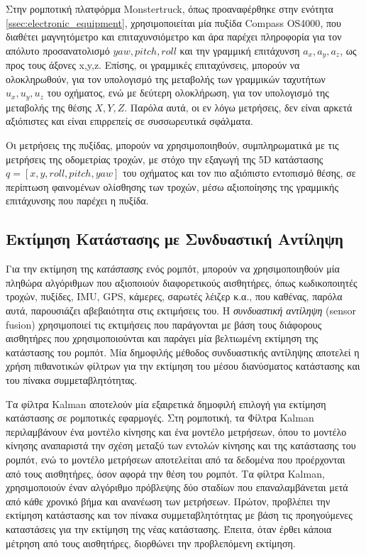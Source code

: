 \bigskip
Στην ρομποτική πλατφόρμα {Monstertruck}, όπως προαναφέρθηκε στην ενότητα \ref{ssec:electronic_equipment}, χρησιμοποιείται μία πυξίδα {Compass OS4000}, που διαθέτει μαγνητόμετρο και επιταχυνσιόμετρο και άρα παρέχει πληροφορία για τον απόλυτο προσανατολισμό $yaw, pitch, roll$ και την γραμμική επιτάχυνση $a_x, a_y, a_z$, ως προς τους άξονες x,y,z. Επίσης, οι γραμμικές επιταχύνσεις, μπορούν να ολοκληρωθούν, για τον υπολογισμό της μεταβολής των γραμμικών ταχυτήτων $u_x, u_y, u_z$ του οχήματος, ενώ με δεύτερη ολοκλήρωση, για τον υπολογισμό της μεταβολής της θέσης $X, Y, Z$. Παρόλα αυτά, οι εν λόγω μετρήσεις, δεν είναι αρκετά αξιόπιστες και είναι επιρρεπείς σε συσσωρευτικά σφάλματα.

\bigskip
Οι μετρήσεις της πυξίδας, μπορούν να χρησιμοποιηθούν, συμπληρωματικά με τις μετρήσεις της {οδομετρίας τροχών}, με στόχο την εξαγωγή της 5D κατάστασης $q = [x, y, roll, pitch, yaw]$  του οχήματος και τον πιο αξιόπιστο εντοπισμό θέσης, σε περίπτωση φαινομένων ολίσθησης των τροχών, μέσω αξιοποίησης της γραμμικής επιτάχυνσης που παρέχει η πυξίδα.

\bigskip
\subsection{Εκτίμηση Κατάστασης με Συνδυαστική Αντίληψη} 
\label{ssec:state_estimation_and_sensor_fusion}
Για την εκτίμηση της \textit{κατάστασης} ενός ρομπότ, μπορούν να χρησιμοποιηθούν μία πληθώρα αλγόριθμων που αξιοποιούν διαφορετικούς αισθητήρες, όπως κωδικοποιητές τροχών, πυξίδες, IMU, GPS, κάμερες, σαρωτές λέιζερ  κ.α., που καθένας, παρόλα αυτά, παρουσιάζει αβεβαιότητα στις εκτιμήσεις του. Η \textit{συνδυαστική αντίληψη} ({sensor fusion}) χρησιμοποιεί τις εκτιμήσεις που παράγονται με βάση τους διάφορους αισθητήρες που χρησιμοποιούνται και παράγει μία βελτιωμένη εκτίμηση της κατάστασης του ρομπότ. Μία δημοφιλής μέθοδος συνδυαστικής αντίληψης αποτελεί η χρήση πιθανοτικών φίλτρων για την εκτίμηση του μέσου διανύσματος κατάστασης και του πίνακα συμμεταβλητότητας.

\bigskip
Τα φίλτρα Kalman αποτελούν μία εξαιρετικά δημοφιλή επιλογή για εκτίμηση κατάστασης σε ρομποτικές εφαρμογές. Στη ρομποτική, τα {Φίλτρα Kalman} περιλαμβάνουν ένα μοντέλο κίνησης και ένα μοντέλο μετρήσεων, όπου το μοντέλο κίνησης αναπαριστά την σχέση μεταξύ των εντολών κίνησης και της κατάστασης του ρομπότ, ενώ το μοντέλο μετρήσεων αποτελείται από τα δεδομένα που προέρχονται από τους αισθητήρες, όσον αφορά την θέση του ρομπότ. Τα φίλτρα Kalman, χρησιμοποιούν έναν αλγόριθμο πρόβλεψης δύο σταδίων που επαναλαμβάνεται μετά από κάθε χρονικό βήμα και ανανέωση των μετρήσεων. Πρώτον, προβλέπει την εκτίμηση κατάστασης και τον πίνακα συμμεταβλητότητας με βάση τις προηγούμενες καταστάσεις για την εκτίμηση της νέας κατάστασης. Έπειτα, όταν έρθει κάποια μέτρηση από τους αισθητήρες, διορθώνει την προβλεπόμενη εκτίμηση.

